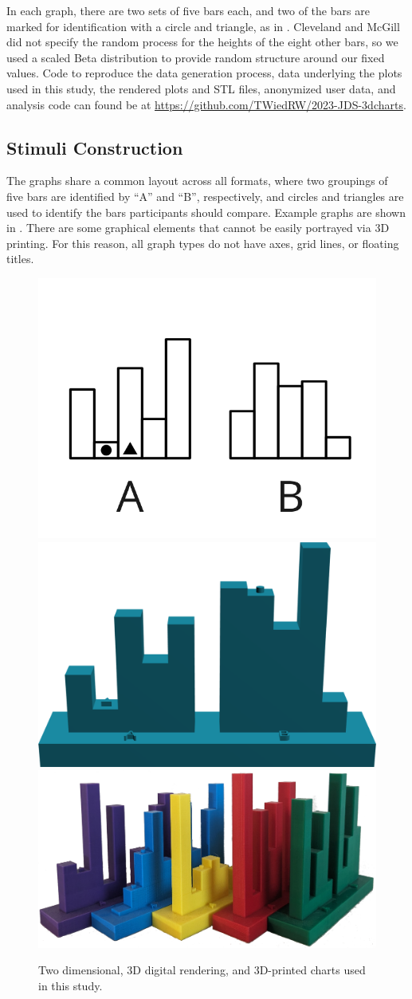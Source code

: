 \documentclass[letterpaper,inpress,dvipsnames]{jdsart}
\begin{document}
In each graph, there are two sets of five bars each, and two of the bars are marked for identification with a circle and triangle, as in .
Cleveland and McGill did not specify the random process for the heights of the eight other bars, so we used a scaled Beta distribution to provide random structure around our fixed values.
Code to reproduce the data generation process, data underlying the plots used in this study, the rendered plots and STL files, anonymized user data, and analysis code can found be at \url{https://github.com/TWiedRW/2023-JDS-3dcharts}.

\hypertarget{stimuli-construction}{%
\subsection{Stimuli Construction}\label{stimuli-construction}}

The graphs share a common layout across all formats, where two groupings of five bars are identified by ``A'' and ``B'', respectively, and circles and triangles are used to identify the bars participants should compare. Example graphs are shown in
.
There are some graphical elements that cannot be easily portrayed via 3D printing. For this reason, all graph types do not have axes, grid lines, or floating titles.

\begin{figure}
\includegraphics[width=0.3\linewidth]{_images/Type1-Rep01} \includegraphics[width=0.3\linewidth]{_images/RenderedChart} \includegraphics[width=0.35\linewidth]{_images/Kit_of_charts} \caption{Two dimensional, 3D digital rendering, and 3D-printed charts used in this study.}\label{fig:plotTypes}
\end{figure}
\end{document}

